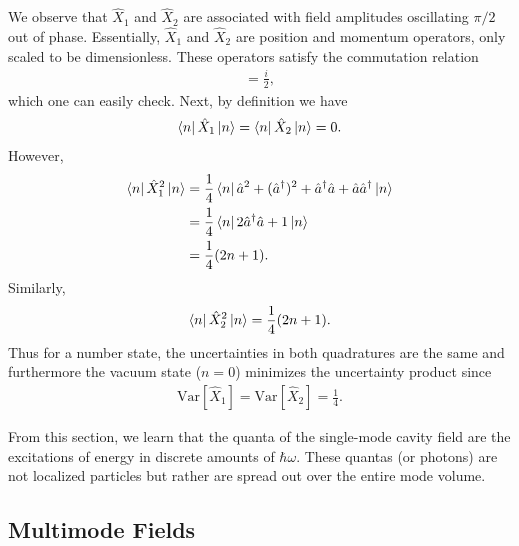 \documentclass{book}
\theoremstyle{definition}
\newcommand{\f}[2]{\frac{#1}{#2}}
\begin{document}
We observe that $\hat{X}_1$ and $\hat{X}_2$ are associated with field amplitudes oscillating $\pi/2$ out of phase. Essentially, $\hat{X}_1$ and $\hat{X}_2$ are position and momentum operators, only scaled to be dimensionless. These operators satisfy the commutation relation
\begin{align}
[\hat{X}_1, \hat{X}_2] = \f{i}{2},
\end{align}
which one can easily check. Next, by definition we have
\begin{align}
\bra{n}\hat{X}_1\ket{n} = \bra{n}\hat{X}_2\ket{n} = 0.
\end{align}
However, 
\begin{align}
\bra{n}\hat{X}_1^2\ket{n} &= \f{1}{4}\bra{n} \hat{a}^2 + (\hat{a}^\dagger)^2 + \hat{a}^\dagger\hat{a} + \hat{a}\hat{a}^\dagger \ket{n}\\
&= \f{1}{4}\bra{n} 2\hat{a}^\dagger\hat{a} + 1 \ket{n}\\
&= \f{1}{4}(2n + 1).
\end{align}
Similarly, 
\begin{align}
\bra{n}\hat{X}_2^2\ket{n} = \f{1}{4}(2n + 1).
\end{align}
Thus for a number state, the uncertainties in both quadratures are the same and furthermore the vacuum state ($n = 0$) minimizes the uncertainty product since
\begin{align}
\text{Var}[\hat{X}_1] = \text{Var}[\hat{X}_2] = \f{1}{4}.
\end{align}

From this section, we learn that the quanta of the single-mode cavity field are the excitations of energy in discrete amounts of $\hbar\omega$. These quantas (or photons) are not localized particles but rather are spread out over the entire mode volume. 

















\subsection{Multimode Fields}
\end{document}
